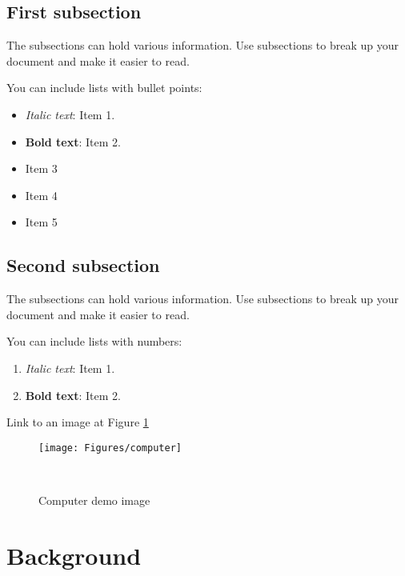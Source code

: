 \documentclass[twocolumn]{article}
\begin{document}
\subsection{First subsection}

The subsections can hold various information. Use subsections to break up your document and make it easier to read.

You can include lists with bullet points:

\begin{itemize}
\item \textit{Italic text}: Item 1.  
  \item \textbf{Bold text}: Item 2. 
  \item Item 3
  \item Item 4
  \item Item 5
\end{itemize}
	
\subsection{Second subsection}

The subsections can hold various information. Use subsections to break up your document and make it easier to read.

You can include lists with numbers:

\begin{enumerate}
  \item \textit{Italic text}: Item 1.  
  \item \textbf{Bold text}: Item 2. 
\end{enumerate}

Link to an image at Figure \ref{fig:computerImg}

\begin{figure}%
\centering
  \texttt{[image: Figures/computer]}
  \caption{Computer demo image}~\label{fig:computerImg}
\end{figure}
	

\section{Background}
\vspace{-1ex}
\end{document}
